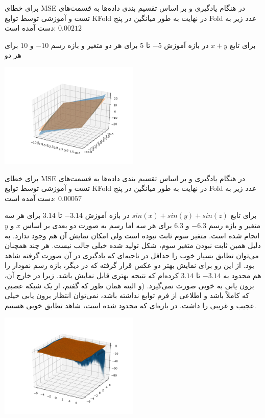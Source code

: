 \documentclass[12pt,titlepage,a4page , tikz , multi,table , svgnames,xcdraw]{article}
\begin{document}
برای خطای MSE در هنگام یادگیری و بر اساس تقسیم بندی داده‌ها به قسمت‌های تست و آموزشی توسط توابع KFold در نهایت به طور میانگین در پنج Fold عدد زیر به دست آمده است:
$ 0.00212$


\hrulefill


\newpage

برای تابع $x+y$ در بازه آموزش $-5$ تا $5$ برای هر دو متغیر و بازه رسم $-10$ و $10$ برای هر دو


\begin{center}

 \includegraphics[width=0.5\textwidth]{pictures/12.png}

\end{center}

برای خطای MSE در هنگام یادگیری و بر اساس تقسیم بندی داده‌ها به قسمت‌های تست و آموزشی توسط توابع KFold در نهایت به طور میانگین در پنج Fold عدد زیر به دست آمده است:
$  0.00057$



\hrulefill

برای تابع $sin(x) + sin(y) + sin(z)$ در بازه آموزش $-3.14$ تا $3.14$ برای هر سه متغیر و بازه رسم $-6.3$ و $6.3$ برای هر سه اما رسم به صورت دو بعدی بر اساس $x$ و $y$ انجام شده است. متغیر سوم ثابت نبوده است ولی امکان نمایش آن هم وجود ندارد. به دلیل همین ثابت نبودن متغیر سوم، شکل تولید شده خیلی جالب نیست. هر چند همچنان می‌توان تطابق بسیار خوب را حداقل در ناحیه‌ای که یادگیری در آن صورت گرفته شاهد بود. از این رو برای نمایش بهتر دو عکس قرار گرفته که در دیگر، بازه رسم نمودار را هم محدود به $-3.14$ تا $3.14$ کرده‌ام که نتیجه بهتری قابل نمایش باشد. زیرا در خارج آن، برون یابی به خوبی صورت نمی‌گیرد. (و البته همان طور که گفتم، از یک شبکه عصبی که کاملاً  باشد و اطلاعی از فرم توابع نداشته باشد، نمی‌توان انتظار برون یابی خیلی عجیب و غریبی را داشت. در بازه‌ای که محدود شده است، شاهد تطابق خوبی هستیم.


\begin{center}

 \includegraphics[width=0.5\textwidth]{pictures/13.png}

\end{center}
\end{document}
